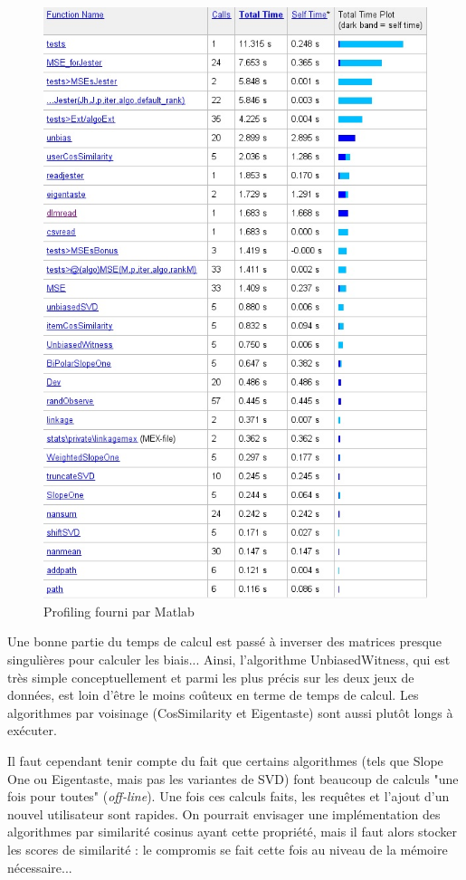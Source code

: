 \documentclass[11pt, openany, a4paper]{article}
\begin{document}
		\begin{figure}[ht!]
			\centering
			\includegraphics{times.jpg}
			\caption{Profiling fourni par Matlab}
		\end{figure}
		

		Une bonne partie du temps de calcul est passé à inverser des matrices presque singulières pour calculer les biais... Ainsi, l'algorithme UnbiasedWitness, qui est très simple conceptuellement et parmi les plus précis sur les deux jeux de données, est loin d'être le moins coûteux en terme de temps de calcul.
		Les algorithmes par voisinage (CosSimilarity et Eigentaste) sont aussi plutôt longs à exécuter.
				
		Il faut cependant tenir compte du fait que certains algorithmes (tels que Slope One ou Eigentaste, mais pas les variantes de SVD) font beaucoup de calculs "une fois pour toutes" (\emph{off-line}). Une fois ces calculs faits, les requêtes et l'ajout d'un nouvel utilisateur sont rapides. On pourrait envisager une implémentation des algorithmes par similarité cosinus ayant cette propriété, mais il faut alors stocker les scores de similarité : le compromis se fait cette fois au niveau de la mémoire nécessaire...
		


\end{document}
